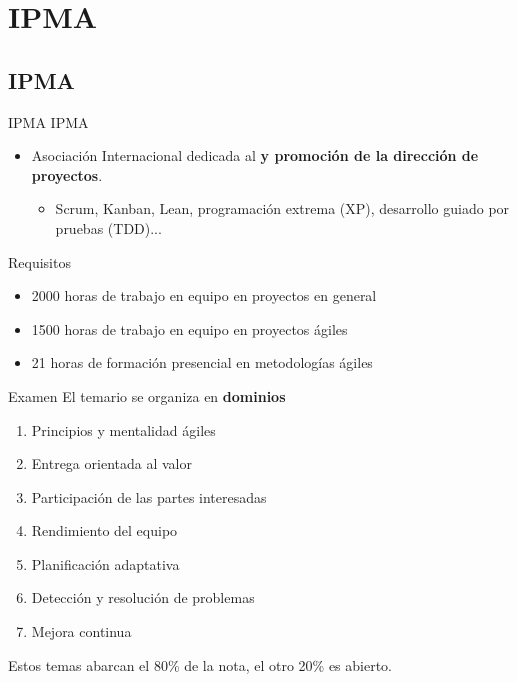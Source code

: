 \section{IPMA}

\subsection{IPMA}
\begin{frame}[allowframebreaks]{IPMA}
	IPMA 
	\begin{itemize}
		\item Asociación Internacional dedicada al \textbf{ y promoción de la dirección de proyectos}.
		\begin{itemize}
			\item Scrum, Kanban, Lean, programación extrema (XP), desarrollo guiado por pruebas (TDD)...
		\end{itemize}
	\end{itemize}
	\begin{block}{Requisitos}
		\begin{itemize}
			\item 2000 horas de trabajo en equipo en proyectos en general
			\item 1500 horas de trabajo en equipo en proyectos ágiles
			\item 21 horas de formación presencial en metodologías ágiles
		\end{itemize}
	\end{block}
	\begin{block}{Examen}
		El temario se organiza en \textbf{dominios}
		\begin{enumerate}
			\item Principios y mentalidad ágiles
			\item Entrega orientada al valor
			\item Participación de las partes interesadas
			\item Rendimiento del equipo
			\item Planificación adaptativa
			\item Detección y resolución de problemas
			\item Mejora continua
		\end{enumerate}
		Estos temas abarcan el 80\% de la nota, el otro 20\% es abierto.
	\end{block}
	
	\framebreak
	

\end{frame}
